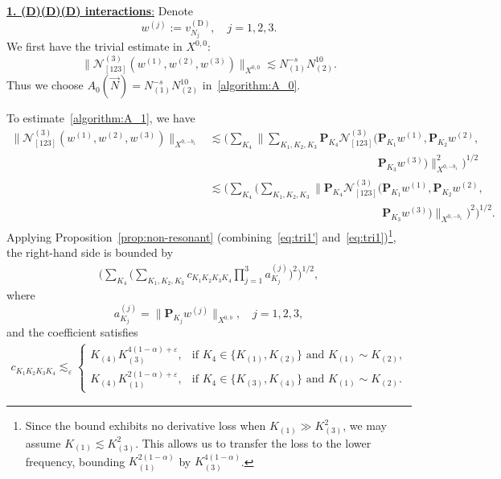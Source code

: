 \documentclass[11pt,reqno,english]{amsart}
\numberwithin{equation}{section}
\theoremstyle{plain}
\theoremstyle{definition}
\theoremstyle{remark}
\renewcommand{\epsilon}{\varepsilon}
\begin{document}
\underline{\textbf{1. (D)(D)(D) interactions}:}
Denote
\[
w^{(j)}:=v_{N_j}^{(\mathrm{D})},\quad j=1,2,3.
\]
We first have the trivial estimate in $X^{0,0}$:
\[
\|\mathcal{N}_{[123]}^{(3)}(w^{(1)},w^{(2)},w^{(3)})\|_{X^{0,0}}\lesssim N_{(1)}^{-s}N_{(2)}^{10}.
\]
Thus we choose $A_0(\vec{N})=N_{(1)}^{-s}N_{(2)}^{10}$ in~\eqref{algorithm:A_0}.

To estimate~\eqref{algorithm:A_1}, we have
\begin{align*}
	\|\mathcal{N}_{[123]}^{(3)}(w^{(1)},w^{(2)},w^{(3)})\|_{X^{0,-b_1}}
	&\lesssim \Big(\sum_{K_4}\Big\|
	\sum_{K_1,K_2,K_3}\mathbf{P}_{K_4}\mathcal{N}_{[123]}^{(3)}(\mathbf{P}_{K_1}w^{(1)},
	\mathbf{P}_{K_2}w^{(2)},\\
	&\phantom{\lesssim\Big(\sum_{K_4}\Big\|\sum_{K_1,K_2,K_3}\mathbf{P}_{K_4}\mathcal{N}_{[123]}^{(3)}(}
	\mathbf{P}_{K_3}w^{(3)})
	\Big\|_{X^{0,-b_1}}^2\Big)^{1/2}\\
	&\lesssim
	\Big(\sum_{K_4}\Big(\sum_{K_1,K_2,K_3}\|
	\mathbf{P}_{K_4}\mathcal{N}_{[123]}^{(3)}(\mathbf{P}_{K_1}w^{(1)},
	\mathbf{P}_{K_2}w^{(2)},\\
	&\phantom{\lesssim\Big(\sum_{K_4}\Big(\sum_{K_1,K_2,K_3}\|\mathbf{P}_{K_4}\mathcal{N}_{[123]}^{(3)}(}
	\mathbf{P}_{K_3}w^{(3)})
	\|_{X^{0,-b_1}}\Big)^2\Big)^{1/2}.
\end{align*}
Applying Proposition~\ref{prop:non-resonant} (combining~\eqref{eq:tri1'} and~\eqref{eq:tri1})\footnote{Since the bound exhibits no derivative loss when $K_{(1)}\gg K_{(3)}^2$, we may assume $K_{(1)}\lesssim K_{(3)}^2$. This allows us to transfer the loss to the lower frequency, bounding $K_{(1)}^{2(1-\alpha)}$ by $K_{(3)}^{4(1-\alpha)}$.}, the right-hand side is bounded by
\begin{align*}
	\Big(\sum_{K_4}\Big(\sum_{K_1,K_2,K_3} c_{K_1 K_2 K_3 K_4}\prod_{j=1}^3 a_{K_j}^{(j)}\Big)^2\Big)^{1/2},
\end{align*}
where
\[
a_{K_j}^{(j)}=\|\mathbf{P}_{K_j}w^{(j)}\|_{X^{0,b}},\quad j=1,2,3,
\]
and the coefficient satisfies
\begin{align}\label{cK1K2K3K4_bd1}
	c_{K_1 K_2 K_3 K_4}\lesssim_{\epsilon}
	\begin{cases}
		K_{(4)}K_{(3)}^{4(1-\alpha)+\epsilon}, &\text{if } K_{4}\in\{K_{(1)},K_{(2)}\} \text{ and } K_{(1)}\sim K_{(2)},\\
		K_{(4)}K_{(1)}^{2(1-\alpha)+\epsilon}, &\text{if } K_4\in\{K_{(3)},K_{(4)}\} \text{ and } K_{(1)}\sim K_{(2)}.
	\end{cases}
\end{align}
\end{document}
